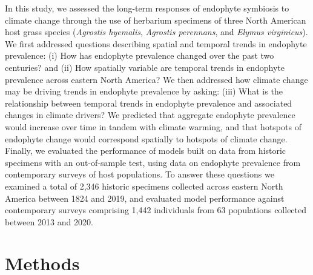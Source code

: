 \documentclass[11pt]{article}
\begin{document}
In this study, we assessed the long-term responses of endophyte symbiosis to climate change through the use of herbarium specimens of three North American host grass species (\emph{Agrostis hyemalis}, \emph{Agrostis perennans}, and \emph{Elymus virginicus}).
We first addressed questions describing spatial and temporal trends in endophyte prevalence: (i) How has endophyte prevalence changed over the past two centuries? and (ii) How spatially variable are temporal trends in endophyte prevalence across eastern North America?
We then addressed how climate change may be driving trends in endophyte prevalence by asking: (iii) What is the relationship between temporal trends in endophyte prevalence and associated changes in climate drivers?
We predicted that aggregate endophyte prevalence would increase over time in tandem with climate warming, and that hotspots of endophyte change would correspond spatially to hotspots of climate change. 
Finally, we evaluated the performance of models built on data from historic specimens with an out-of-sample test, using data on endophyte prevalence from contemporary surveys of host populations. 
To answer these questions we examined a total of 2,346 historic specimens collected across eastern North America between 1824 and 2019, and evaluated model performance against contemporary surveys comprising 1,442 individuals from 63 populations collected between 2013 and 2020.
	
\section*{Methods}
\end{document}
